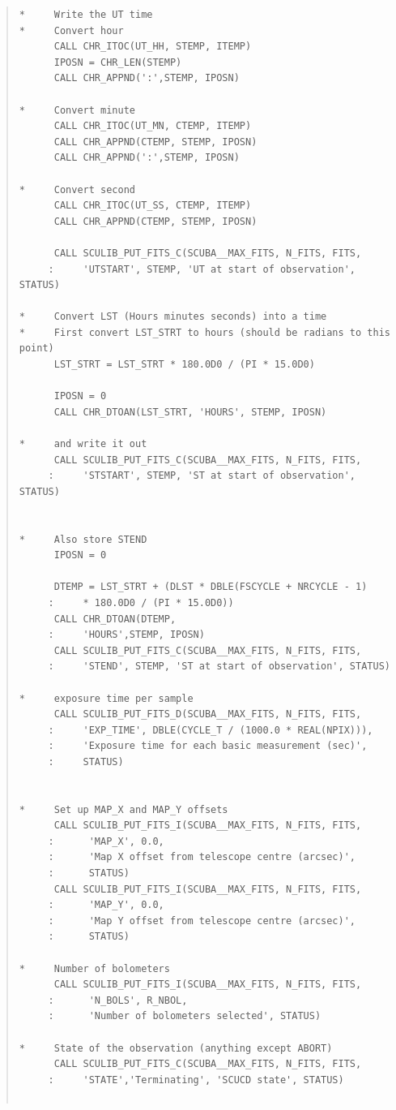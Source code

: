 \documentclass[twoside,11pt]{article}
\newenvironment{myquote}{\begin{quote}\begin{small}}{\end{small}\end{quote}}
\renewcommand{\_}{\texttt{\symbol{95}}}
\begin{document}
\begin{myquote}
\begin{verbatim}
*     Write the UT time
*     Convert hour
      CALL CHR_ITOC(UT_HH, STEMP, ITEMP)
      IPOSN = CHR_LEN(STEMP)
      CALL CHR_APPND(':',STEMP, IPOSN)

*     Convert minute
      CALL CHR_ITOC(UT_MN, CTEMP, ITEMP)
      CALL CHR_APPND(CTEMP, STEMP, IPOSN)
      CALL CHR_APPND(':',STEMP, IPOSN)

*     Convert second
      CALL CHR_ITOC(UT_SS, CTEMP, ITEMP)
      CALL CHR_APPND(CTEMP, STEMP, IPOSN)

      CALL SCULIB_PUT_FITS_C(SCUBA__MAX_FITS, N_FITS, FITS,
     :     'UTSTART', STEMP, 'UT at start of observation', STATUS)

*     Convert LST (Hours minutes seconds) into a time
*     First convert LST_STRT to hours (should be radians to this point)
      LST_STRT = LST_STRT * 180.0D0 / (PI * 15.0D0)

      IPOSN = 0
      CALL CHR_DTOAN(LST_STRT, 'HOURS', STEMP, IPOSN)

*     and write it out
      CALL SCULIB_PUT_FITS_C(SCUBA__MAX_FITS, N_FITS, FITS,
     :     'STSTART', STEMP, 'ST at start of observation', STATUS)


*     Also store STEND
      IPOSN = 0

      DTEMP = LST_STRT + (DLST * DBLE(FSCYCLE + NRCYCLE - 1) 
     :     * 180.0D0 / (PI * 15.0D0))
      CALL CHR_DTOAN(DTEMP,
     :     'HOURS',STEMP, IPOSN)
      CALL SCULIB_PUT_FITS_C(SCUBA__MAX_FITS, N_FITS, FITS,
     :     'STEND', STEMP, 'ST at start of observation', STATUS)

*     exposure time per sample
      CALL SCULIB_PUT_FITS_D(SCUBA__MAX_FITS, N_FITS, FITS,
     :     'EXP_TIME', DBLE(CYCLE_T / (1000.0 * REAL(NPIX))),
     :     'Exposure time for each basic measurement (sec)',
     :     STATUS)


*     Set up MAP_X and MAP_Y offsets
      CALL SCULIB_PUT_FITS_I(SCUBA__MAX_FITS, N_FITS, FITS,
     :      'MAP_X', 0.0, 
     :      'Map X offset from telescope centre (arcsec)',
     :      STATUS)
      CALL SCULIB_PUT_FITS_I(SCUBA__MAX_FITS, N_FITS, FITS,
     :      'MAP_Y', 0.0, 
     :      'Map Y offset from telescope centre (arcsec)',
     :      STATUS)

*     Number of bolometers
      CALL SCULIB_PUT_FITS_I(SCUBA__MAX_FITS, N_FITS, FITS,
     :      'N_BOLS', R_NBOL, 
     :      'Number of bolometers selected', STATUS)

*     State of the observation (anything except ABORT)
      CALL SCULIB_PUT_FITS_C(SCUBA__MAX_FITS, N_FITS, FITS,
     :     'STATE','Terminating', 'SCUCD state', STATUS)


\end{verbatim}
\end{myquote}
\end{document}
